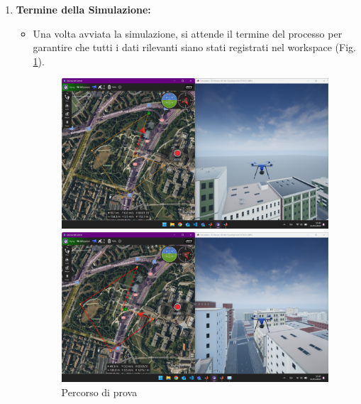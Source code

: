 \begin{enumerate}
    \item \textbf{Termine della Simulazione:}
    \begin{itemize}
        \item Una volta avviata la simulazione, si attende il termine del processo per garantire che tutti i dati rilevanti siano stati registrati nel workspace (Fig. \ref{fig:Percorso di prova}).
        \begin{figure}[htbp]
            \begin{minipage}[b]{0.5\linewidth} %
              \centering
              \includegraphics[width=\linewidth]{files/images/path1.png} %
            \end{minipage}%
            \begin{minipage}[b]{0.5\linewidth} %
                \centering
                \includegraphics[width=\linewidth]{files/images/path1_finish.png} %
            \end{minipage}
            \caption{Percorso di prova}
            \label{fig:Percorso di prova}
        \end{figure}
        

\end{itemize}
\end{enumerate}
